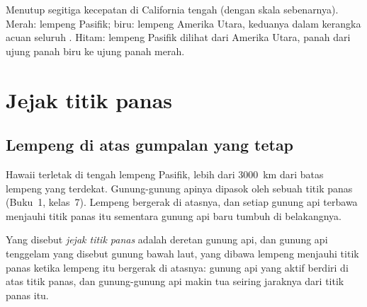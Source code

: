 \begin{omfigure}

{\small Menutup segitiga kecepatan di California tengah (dengan skala
sebenarnya). Merah: lempeng Pasifik; biru: lempeng Amerika Utara, keduanya dalam
kerangka acuan seluruh . Hitam: lempeng Pasifik dilihat dari Amerika
Utara, panah dari ujung panah biru ke ujung panah merah.}
\end{omfigure}

\section{Jejak titik panas}

\subsection{Lempeng di atas gumpalan yang tetap}

Hawaii terletak di tengah lempeng Pasifik, lebih dari \qty{3000}{km}
dari batas lempeng yang terdekat.
 Gunung-gunung apinya dipasok oleh sebuah titik panas (Buku~1,
kelas~7). Lempeng bergerak di atasnya, dan setiap gunung api terbawa menjauhi
titik panas itu sementara gunung api baru tumbuh di belakangnya.

\begin{definition}\label{def:g11:plate-motions:hotspot-track}
Yang disebut \emph{jejak titik panas} adalah deretan
gunung api, dan gunung api tenggelam yang disebut gunung bawah laut, yang dibawa
lempeng menjauhi titik panas ketika lempeng itu bergerak di atasnya: gunung api
yang aktif berdiri di atas titik panas, dan gunung-gunung api makin tua seiring
jaraknya dari titik panas itu.
\end{definition}

